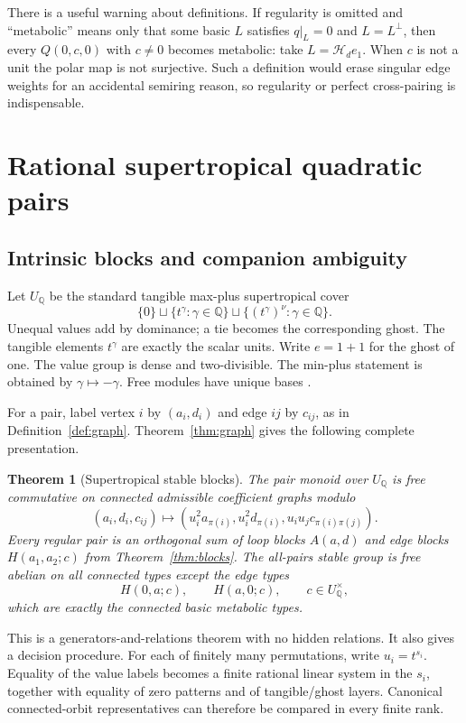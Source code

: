 \documentclass[11pt]{article}
\newtheorem{theorem}{Theorem}[section]
\theoremstyle{definition}
\theoremstyle{remark}
\newcommand{\Rationals}{\mathbb Q}
\newcommand{\Hess}{\mathcal H}
\begin{document}
There is a useful warning about definitions.  If regularity is omitted and
``metabolic'' means only that some basic \(L\) satisfies \(q|_L=0\) and
\(L=L^\perp\), then every \(Q(0,c,0)\) with \(c\ne0\) becomes metabolic: take
\(L=\Hess_de_1\).  When \(c\) is not a unit the polar map is not surjective.
Such a definition would erase singular edge weights for an accidental
semiring reason, so regularity or perfect cross-pairing is indispensable.

\section{Rational supertropical quadratic pairs}\label{sec:supertropical}

\subsection{Intrinsic blocks and companion ambiguity}

Let \(U_{\Rationals}\) be the standard tangible max-plus supertropical cover
\[
\{0\}\sqcup\{t^\gamma:\gamma\in\Rationals\}
 \sqcup\{(t^\gamma)^\nu:\gamma\in\Rationals\}.
\]
Unequal values add by dominance; a tie becomes the corresponding ghost.  The
tangible elements \(t^\gamma\) are exactly the scalar units.  Write
\(e=1+1\) for the ghost of one.  The
value group is dense and two-divisible.  The min-plus statement is obtained by
\(\gamma\mapsto-\gamma\).  Free modules have unique bases
\cite[Theorem~0.9]{ikr2016qf1}.

For a pair, label vertex \(i\) by \((a_i,d_i)\) and edge \(ij\) by
\(c_{ij}\), as in Definition~\ref{def:graph}.  Theorem~\ref{thm:graph} gives
the following complete presentation.

\begin{theorem}[Supertropical stable blocks]\label{thm:superstable}
The pair monoid over \(U_{\Rationals}\) is free commutative on connected
admissible coefficient graphs modulo
\[
 (a_i,d_i,c_{ij})\mapsto
 (u_i^2a_{\pi(i)},u_i^2d_{\pi(i)},u_iu_jc_{\pi(i)\pi(j)}).
\]
Every regular pair is an orthogonal sum of loop blocks \(A(a,d)\) and edge
blocks \(H(a_1,a_2;c)\) from Theorem~\ref{thm:blocks}.  The all-pairs stable
group is free abelian on all connected types except the edge types
\[
 H(0,a;c),\qquad H(a,0;c),\qquad c\in U_{\Rationals}^\times,
\]
which are exactly the connected basic metabolic types.
\end{theorem}

This is a generators-and-relations theorem with no hidden relations.  It also
gives a decision procedure.  For each of finitely many permutations, write
\(u_i=t^{s_i}\).  Equality of the value labels becomes a finite rational
linear system in the \(s_i\), together with equality of zero patterns and of
tangible/ghost layers.  Canonical connected-orbit representatives can
therefore be compared in every finite rank.
\end{document}
